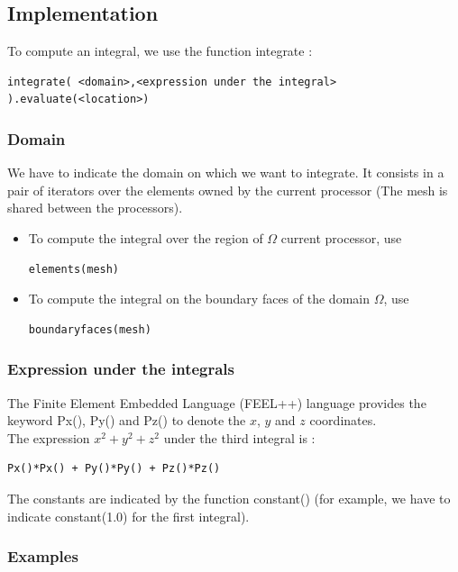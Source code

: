 \subsection{Implementation}

To compute an integral, we use the function integrate :
\begin{lstlisting}
integrate( <domain>,<expression under the integral> ).evaluate(<location>)
\end{lstlisting}

\subsubsection{Domain}

We have to indicate the domain on which we want to integrate. It consists in a pair of iterators over the elements owned by the current processor (The mesh is shared between the processors).
\begin{itemize}
\item To compute the integral over the region of $\Omega$ current processor, use
\begin{lstlisting}
elements(mesh)
\end{lstlisting}
\item To compute the integral on the boundary faces of the domain $\Omega$, use
\begin{lstlisting}
boundaryfaces(mesh)
\end{lstlisting}
\end{itemize}

\subsubsection{Expression under the integrals}

The Finite Element Embedded Language (FEEL++) language provides the keyword Px(), Py() and Pz() to denote the $x$, $y$ and $z$ coordinates. \\
The expression $x^2 + y^2 + z^2$ under the third integral is :
\begin{lstlisting}
Px()*Px() + Py()*Py() + Pz()*Pz()
\end{lstlisting}
\vspace{0.2cm}
The constants are indicated by the function constant() (for example, we have to indicate constant(1.0) for the first integral). \\

\subsubsection{Examples}

